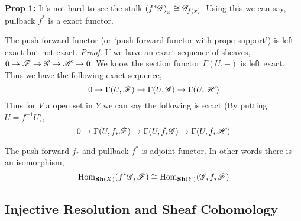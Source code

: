 \documentclass[11pt]{article}
\begin{document}
   \vspace*{0.2cm}

   \noindent \textcolor{link}{\textbf{Prop 1:}} It's not hard to see the stalk $\qty(f^{\ast}\mathscr{G})_{x} \cong \mathscr{G}_{f(x)}$. Using this we can say, pullback $f^{\ast}$ is a exact functor.
  
   \vspace*{0.2cm}

   \noindent {} The push-forward functor (or `push-forward functor with prope support') is left-exact but not exact. 
   \noindent \textit{Proof}. If we have an exact sequence of sheaves, $0 \to \mathscr{F} \to \mathscr{G} \to \mathscr{H} \to 0$. We know the section functor $\Gamma(U,-)$ is left exact. Thus we have the following exact sequence, 
   \[ 0 \to \Gamma(U,\mathscr{F})\to \Gamma(U,\mathscr{G}) \to \Gamma(U,\mathscr{H})\] 
   Thus for $V$ a open set in $Y$ we can say the following is exact (By putting $U = f^{-1}U$), 
   \[ 0 \to \Gamma(U,f_{\ast}\mathscr{F})\to \Gamma(U,f_{\ast}\mathscr{G}) \to \Gamma(U,f_{\ast}\mathscr{H})\] 
  
  \begin{Thm}{}{}
     \hspace*{0.1cm} The push-forward $f_{\ast}$ and pullback $f^{\ast}$ is adjoint functor. In other words there is an isomorphism, $$\operatorname{Hom}_{\mathbf{Sh}(X)}(f^{\ast}\mathscr{G},\mathscr{F}) \cong \operatorname{Hom}_{\mathbf{Sh}(Y)}(\mathscr{G},f_{\ast}\mathscr{F})$$
  \end{Thm}
  

 \subsection{Injective Resolution and Sheaf Cohomology}
\end{document}
